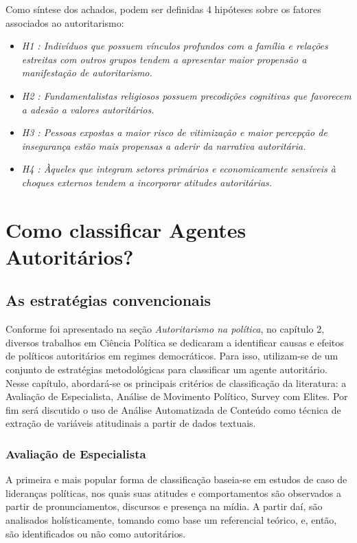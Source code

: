 \documentclass[
12pt,				%
openright,			%
twoside,			%
a4paper,			%
english,			%
french,				%
spanish,			%
brazil				%
]{abntex2}
\begin{document}
Como síntese dos achados, podem ser definidas 4 hipóteses sobre os fatores associados ao autoritarismo:

\begin{itemize}
	\item \textit{H1 : Indivíduos que possuem vínculos profundos com a família e relações estreitas com outros grupos tendem a apresentar maior propensão a manifestação de autoritarismo.}
	\item \textit{H2 : Fundamentalistas religiosos possuem precodições cognitivas que favorecem a adesão a valores autoritários.}
	\item \textit{H3 : Pessoas expostas a maior risco de vitimização e maior percepção de insegurança estão mais propensas a aderir da narrativa autoritária.}
	\item \textit{H4 : Àqueles que integram setores primários e economicamente sensíveis à choques externos tendem a incorporar atitudes autoritárias.}
\end{itemize} 


\chapter{Como classificar Agentes Autoritários?}\label{metodologia}

\section{As estratégias convencionais}

Conforme foi apresentado na seção \emph{Autoritarismo na política}, no capítulo 2, diversos trabalhos em Ciência Política se dedicaram a identificar causas e efeitos de políticos autoritários em regimes democráticos. Para isso, utilizam-se de um conjunto de estratégias metodológicas para classificar um agente autoritário. Nesse capítulo, abordará-se os principais critérios de classificação da literatura: a Avaliação de Especialista, Análise de Movimento Político, Survey com Elites. Por fim será discutido o uso de Análise Automatizada de Conteúdo como técnica de extração de variáveis atitudinais a partir de dados textuais.

\subsection{Avaliação de Especialista}

A primeira e mais popular forma de classificação baseia-se em estudos de caso de lideranças políticas, nos quais suas atitudes e comportamentos são observados a partir de pronunciamentos, discursos e presença na mídia. A partir daí, são analisados holísticamente, tomando como base um referencial teórico, e, então, são identificados ou não como autoritários.
\end{document}
